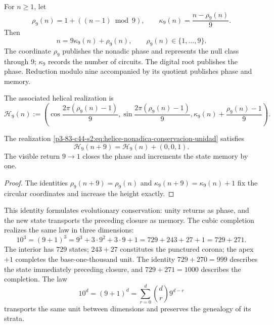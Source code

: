 For \(n\geq1\), let
\begin{equation}
 \rho_9(n)=1+((n-1)\bmod 9),
 \qquad
 \kappa_9(n)=\frac{n-\rho_9(n)}9.
 \label{p3-83-c44-s2:eq:residuo-cociente-conservacion-unidad}
\end{equation}
Then
\[
 n=9\kappa_9(n)+\rho_9(n),
 \qquad
 \rho_9(n)\in\{1,\ldots,9\}.
\]
The coordinate \(\rho_9\) publishes the nonadic phase and represents the null class
through \(9\); \(\kappa_9\) records the number of circuits. The digital root
publishes the phase. Reduction modulo nine accompanied by its quotient publishes
phase and memory.

The associated helical realization is
\begin{equation}
 \mathcal H_9(n):=
 \left(
 \cos\frac{2\pi(\rho_9(n)-1)}9,
 \sin\frac{2\pi(\rho_9(n)-1)}9,
 \kappa_9(n)+\frac{\rho_9(n)-1}{9}
 \right).
 \label{p3-83-c44-s2:eq:helice-nonadica-conservacion-unidad}
\end{equation}

\begin{proposition}
\label{p3-83-c44-s2:prop:retorno-fase-avance-memoria}
The realization \eqref{p3-83-c44-s2:eq:helice-nonadica-conservacion-unidad} satisfies
\[
 \mathcal H_9(n+9)=\mathcal H_9(n)+(0,0,1).
\]
The visible return \(9\to1\) closes the phase and increments the state
memory by one.
\end{proposition}

\begin{proof}
The identities
\(\rho_9(n+9)=\rho_9(n)\) and
\(\kappa_9(n+9)=\kappa_9(n)+1\) fix the circular coordinates and
increase the height exactly.
\end{proof}

This identity formulates evolutionary conservation: unity returns as
phase, and the new state transports the preceding closure as memory. The
cubic completion realizes the same law in three dimensions:
\begin{equation}
 10^3=(9+1)^3
 =9^3+3\cdot9^2+3\cdot9+1
 =729+243+27+1
 =729+271.
 \label{p3-83-c44-s2:eq:emrh-conservacion-evolutiva-unidad}
\end{equation}
The interior has \(729\) states; \(243+27\) constitutes the punctured
corona; the apex \(+1\) completes the base-one-thousand unit. The identity
\(729+270=999\) describes the state immediately preceding closure, and
\(729+271=1000\) describes the completion. The law
\[
 10^d=(9+1)^d
 =\sum_{r=0}^{d}\binom dr9^{d-r}
\]
transports the same unit between dimensions and preserves the genealogy of its
strata.

